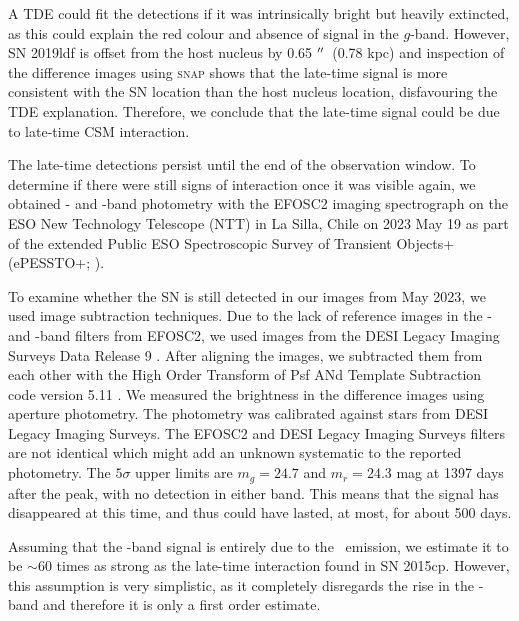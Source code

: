 \documentclass[a4paper,oneside,12pt, class=Latex/Classes/PhDthesisPSnPDF, crop=false]{standalone}
\begin{document}
A TDE could fit the detections if it was intrinsically bright but heavily extincted, as this could explain the red colour and absence of signal in the $g$-band. However, SN 2019ldf is offset from the host nucleus by 0.65 $^{\prime\prime}$~(0.78 kpc) and inspection of the difference images using \textsc{snap} shows that the late-time signal is more consistent with the SN location than the host nucleus location, disfavouring the TDE explanation. Therefore, we conclude that the late-time signal could be due to late-time CSM interaction.

The late-time detections persist until the end of the observation window. To determine if there were still signs of interaction once it was visible again, we obtained \ztfg- and \ztfr-band photometry with the EFOSC2 imaging spectrograph \citep{EFOSC2} on the ESO New Technology Telescope (NTT) in La Silla, Chile on 2023 May 19 as part of the extended Public ESO Spectroscopic Survey of Transient Objects+ (ePESSTO+; \citealt{PESSTO}).

To examine whether the SN is still detected in our images from May 2023, we used image subtraction techniques. Due to the lack of reference images in the \ztfg- and \ztfr-band filters from EFOSC2, we used images from the DESI Legacy Imaging Surveys Data Release 9 \citep{DESI-Legacy_Imaging_Surveys}. After aligning the images, we subtracted them from each other with the High Order Transform of Psf ANd Template Subtraction code version 5.11 \citep[\textsc{hotpants};][]{HOTPANTS}. We measured the brightness in the difference images using aperture photometry. The photometry was calibrated against stars from DESI Legacy Imaging Surveys. The EFOSC2 and DESI Legacy Imaging Surveys filters are not identical which might add an unknown systematic to the reported photometry. The $5\sigma$ upper limits are $m_g = 24.7$ and $m_r = 24.3$ mag at 1397 days after the peak, with no detection in either band. This means that the signal has disappeared at this time, and thus could have lasted, at most, for about 500 days.

Assuming that the \ztfr-band signal is entirely due to the \Halpha~emission, we estimate it to be $\sim$60 times as strong as the late-time interaction found in SN 2015cp. However, this assumption is very simplistic, as it completely disregards the rise in the \ztfi-band and therefore it is only a first order estimate.
\end{document}
